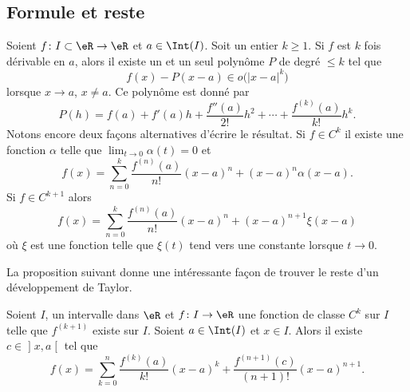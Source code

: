 \subsection{Formule et reste}

\begin{proposition}     \label{PropDevTaylorPol}
    Soient $f\colon I\subset\eR\to \eR$ et $a\in\Int(I)$. Soit un entier $k\geq 1$. Si $f$ est $k$ fois dérivable en $a$, alors il existe un et un seul polynôme $P$ de degré $\leq k$ tel que
    \begin{equation}
        f(x)-P(x-a)\in o\big( | x-a |^k \big)
    \end{equation}
    lorsque $x\to a$, $x\neq a$. Ce polynôme  est donné par
    \begin{equation}
        P(h)=f(a)+f'(a)h+\frac{ f''(a) }{ 2! }h^2+\cdots+\frac{ f^{(k)}(a) }{ k! }h^k.
    \end{equation}
    Notons encore deux façons alternatives d'écrire le résultat. Si \( f\in C^k\) il existe une fonction \( \alpha\) telle que \( \lim_{t\to 0} \alpha(t)=0\) et
    \begin{equation}
        f(x)=\sum_{n=0}^k\frac{ f^{(n)}(a) }{ n! }(x-a)^n+(x-a)^n\alpha(x-a).
    \end{equation}
    Si \( f\in C^{k+1}\) alors
    \begin{equation}        \label{EquQtpoN}
        f(x)=\sum_{n=0}^k\frac{ f^{(n)}(a) }{ n! }(x-a)^n+(x-a)^{n+1}\xi(x-a)
    \end{equation}
    où \( \xi\) est une fonction telle que \( \xi(t)\) tend vers une constante lorsque \( t\to 0\).
\end{proposition}

La proposition suivant donne une intéressante façon de trouver le reste d'un développement de Taylor.
\begin{proposition}     \label{PropResteTaylorc}
Soient $I$, un intervalle dans $\eR$ et $f\colon I\to \eR$ une fonction de classe $C^k$ sur $I$ telle que $f^{(k+1)}$ existe sur $I$. Soient $a\in\Int(I)$ et $x\in I$. Alors il existe $c\in\mathopen] x , a \mathclose[$ tel que
\begin{equation}
    f(x)=\sum_{k=0}^n\frac{ f^{(k)}(a) }{ k! }(x-a)^k+\frac{ f^{(n+1)}(c) }{ (n+1)! }(x-a)^{n+1}.
\end{equation}
\end{proposition}

